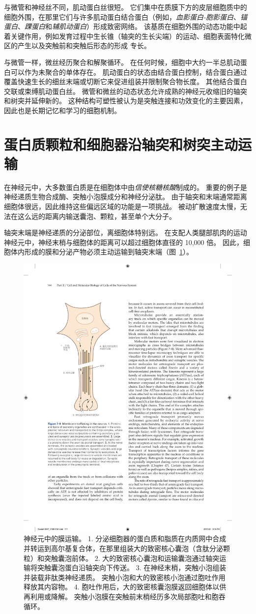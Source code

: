 与微管和神经丝不同，肌动蛋白丝很短。
它们集中在质膜下方的皮层细胞质中的细胞外围，在那里它们与许多肌动蛋白结合蛋白（例如，\textit{血影蛋白-胞影蛋白}、\textit{锚蛋白}、\textit{踝蛋白}和\textit{辅肌动蛋白}）形成致密网络。
该基质在细胞外围的动态功能中起着关键作用，例如发育过程中生长锥（轴突的生长尖端）的运动、细胞表面特化微区的产生以及突触前和突触后形态的形成 专长。


与微管一样，微丝经历聚合和解聚循环。
在任何时候，细胞中大约一半总肌动蛋白可以作为未聚合的单体存在。
肌动蛋白的状态由结合蛋白控制，结合蛋白通过覆盖快速生长的细丝末端或切断它来促进组装并限制聚合物长度。 
其他结合蛋白交联或束缚肌动蛋白丝。
微管和微丝的动态状态允许成熟的神经元收缩旧的轴突和树突并延伸新的。
这种结构可塑性被认为是突触连接和功效变化的主要因素，因此也是长期记忆和学习的细胞机制。



\section{蛋白质颗粒和细胞器沿轴突和树突主动运输}

在神经元中，大多数蛋白质是在细胞体中由\textit{信使核糖核酸}制成的。
重要的例子是神经递质生物合成酶、突触小泡膜成分和神经分泌肽。
由于轴突和末端通常距离细胞体很远，因此维持这些偏远区域的功能是一项挑战。
被动扩散速度太慢，无法在这么远的距离内输送囊泡、颗粒，甚至单个大分子。


轴突末端是神经递质的分泌部位，离细胞体特别远。
在支配人类腿部肌肉的运动神经元中，神经末梢与细胞体的距离可以超过细胞体直径的 10,000 倍。
因此，细胞体内形成的膜和分泌产物必须主动运输到轴突末端（图~\ref{fig:7_9}）。


\begin{figure}[htbp]
	\centering
	\includegraphics[width=0.5\linewidth]{chap07/fig_7_9}
	\caption{神经元中的膜运输。
		1. 分泌细胞器的蛋白质和脂质在内质网中合成并转运到高尔基复合体，在那里组装大的致密核心囊泡（含肽分泌颗粒）和突触囊泡前体。
		2. 大的致密核心囊泡和运输囊泡通过轴突运输将突触囊泡蛋白沿轴突向下传送。
		3. 在神经末梢，突触小泡组装并装载非肽类神经递质。
		突触小泡和大的致密核小泡通过胞吐作用释放其内容物。
		4. 胞吐作用后，大的致密核囊泡膜返回细胞体以供再利用或降解。
		突触小泡膜在突触前末梢经历多次局部胞吐和胞吞循环。}
	\label{fig:7_9}
\end{figure}


